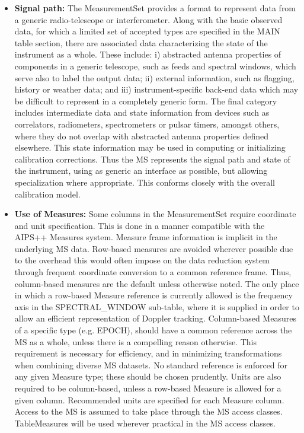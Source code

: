 \documentclass{article}
\begin{document}
\begin{itemize}

\item{{\bf Signal path:} The MeasurementSet provides a format to
represent data from a generic radio-telescope or interferometer. Along
with the basic observed data, for which a limited set of accepted
types are specified in the MAIN table section, there are associated
data characterizing the state of the instrument as a whole. These
include: i) abstracted antenna properties of components in a generic
telescope, such as feeds and spectral windows, which serve also to
label the output data; ii) external information, such as flagging,
history or weather data; and iii) instrument-specific back-end data
which may be difficult to represent in a completely generic form. The
final category includes intermediate data and state information from
devices such as correlators, radiometers, spectrometers or pulsar
timers, amongst others, where they do not overlap with abstracted
antenna properties defined elsewhere. This state information may be
used in computing or initializing calibration corrections. Thus the MS
represents the signal path and state of the instrument, using as
generic an interface as possible, but allowing specialization where
appropriate. This conforms closely with the overall calibration
model.}

\item{{\bf Use of Measures:} Some columns in the MeasurementSet
require coordinate and unit specification. This is done in a manner
compatible with the AIPS++ Measures system. Measure frame information
is implicit in the underlying MS data. Row-based measures are avoided
wherever possible due to the overhead this would often impose on the
data reduction system through frequent coordinate conversion to a
common reference frame. Thus, column-based measures are the default
unless otherwise noted. The only place in which a row-based Measure
reference is currently allowed is the frequency axis in the
SPECTRAL\_WINDOW sub-table, where it is supplied in order to allow an
efficient representation of Doppler tracking. Column-based Measures of
a specific type (e.g. EPOCH), should have a common reference across
the MS as a whole, unless there is a compelling reason otherwise. This
requirement is necessary for efficiency, and in minimizing
transformations when combining diverse MS datasets. No standard
reference is enforced for any given Measure type; these should be
chosen prudently. Units are also required to be column-based, unless a
row-based Measure is allowed for a given column. Recommended units are
specified for each Measure column. Access to the MS is assumed to take
place through the MS access classes. TableMeasures will be used
wherever practical in the MS access classes.}


\end{itemize}
\end{document}
